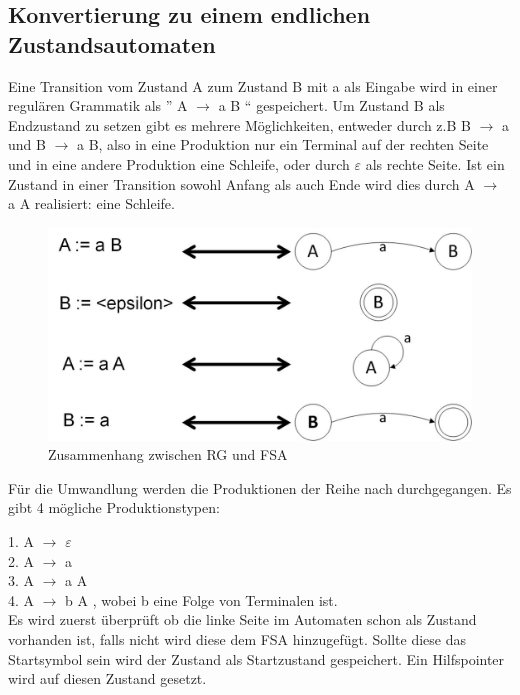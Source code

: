 \subsection{Konvertierung zu einem endlichen Zustandsautomaten}

Eine Transition vom Zustand A zum Zustand B mit a als Eingabe wird in einer
regulären Grammatik als '' A $\rightarrow$ a B `` gespeichert.
Um Zustand B als Endzustand zu setzen gibt es mehrere Möglichkeiten, entweder
durch z.B B $\rightarrow$ a und B $\rightarrow$ a B, also in eine Produktion nur
ein Terminal auf der rechten Seite und in eine andere Produktion eine Schleife,
oder durch $\varepsilon$ als rechte Seite.
Ist ein Zustand in einer Transition sowohl Anfang als auch Ende wird dies durch
A $\rightarrow$ a A realisiert: eine Schleife.

\begin{figure}[h]
  \begin{center}
  \includegraphics[scale = 0.4]{objectsToInclude/convGram.jpg}
  \caption{Zusammenhang zwischen RG und FSA}
  \label{fig:convGrammar}
  \end{center}
\end{figure}

Für die Umwandlung werden die Produktionen der Reihe nach durchgegangen.
Es gibt 4 mögliche Produktionstypen:

1. A $\rightarrow$ $\varepsilon$ \\
2. A $\rightarrow$ a\\
3. A $\rightarrow$ a A\\
4. A $\rightarrow$ b A , wobei b eine Folge von Terminalen ist.\\

Es wird zuerst überprüft ob die linke Seite im Automaten schon als Zustand
vorhanden ist, falls nicht wird diese dem FSA hinzugefügt. Sollte diese das
Startsymbol sein wird der Zustand als Startzustand gespeichert. Ein Hilfspointer wird
auf diesen Zustand gesetzt.

